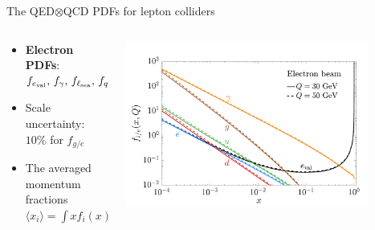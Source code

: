 \documentclass[aspectratio=169]{beamer}
\begin{document}
\begin{frame}{The QED$\otimes$QCD PDFs for lepton colliders}
	\begin{columns}
		\begin{column}{0.65\textwidth}
			\begin{itemize}
				\item \textcolor{PittRoyal}{\bf Electron PDFs}: $f_{e_{\rm val}},\, f_\gamma,\, f_{\ell_{\rm sea}},\, f_q,\, f_g$
				\item Scale uncertainty: $10\%$ for $f_{g/e}$
				\item The averaged momentum fractions $\langle x_i\rangle=\int xf_i(x)\dd x$
				\begin{table}[tb]
				\end{table}
			\end{itemize}
		\end{column}
		\begin{column}{0.45\textwidth}
			\includegraphics[width=0.85\textwidth]{figs/QECDe}
		\end{column}
	\end{columns}
	\begin{columns}

\end{columns}
\end{frame}
\end{document}
